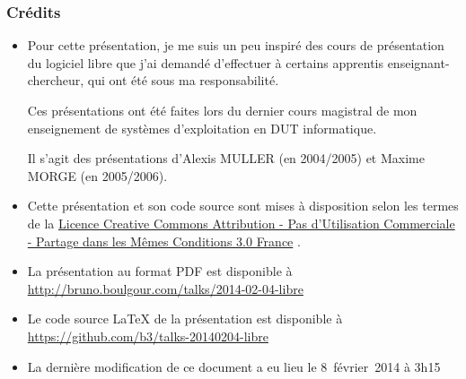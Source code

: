\documentclass[10pt]{beamer}
\begin{document}
\begin{frame}
  \frametitle{Crédits}

  \small

  \begin{itemize}
  \item Pour cette présentation, je me suis un peu inspiré des cours de
    présentation du logiciel libre que j'ai demandé d'effectuer à certains
    apprentis enseignant-chercheur, qui ont été sous ma responsabilité.

    Ces présentations ont été faites lors du dernier cours magistral de mon
    enseignement de systèmes d'exploitation en DUT informatique.

    Il s'agit des présentations d'Alexis MULLER (en 2004/2005) et Maxime
    MORGE (en 2005/2006).
  
    \vfill
    
  \item Cette présentation et son code source sont mises à disposition
    selon les termes de la
    \href{https://creativecommons.org/licenses/by-nc-sa/3.0/fr/legalcode}{Licence
      Creative Commons Attribution - Pas d’Utilisation Commerciale - Partage
      dans les Mêmes Conditions 3.0 France} \ccbyncsa.

    \vfill

  \item La présentation au format PDF est disponible à \url{http://bruno.boulgour.com/talks/2014-02-04-libre}

    \vfill

  \item Le code source LaTeX de la présentation est disponible à \url{https://github.com/b3/talks-20140204-libre}

  \item La dernière modification de ce document a eu lieu le 8~février~2014 à 3h15 %
  \end{itemize}
\end{frame}
\end{document}
